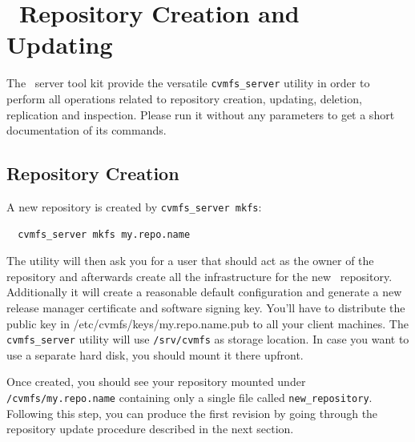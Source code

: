 
\section{\cvmfs\ Repository Creation and Updating}
\label{sct:repocreateandupdate}
The \cvmfs\ server tool kit provide the versatile \texttt{cvmfs\_server} utility in order to perform all operations related to repository creation, updating, deletion, replication and inspection.
Please run it without any parameters to get a short documentation of its commands.

\subsection{Repository Creation}
\label{sct:repocreation}

A new repository is created by \texttt{cvmfs\_server mkfs}:
\begin{verbatim}
  cvmfs_server mkfs my.repo.name
\end{verbatim}
The utility will then ask you for a user that should act as the owner of the repository and afterwards create all the infrastructure for the new \cvmfs\ repository.
Additionally it will create a reasonable default configuration and generate a new release manager certificate and software signing key. 
You'll have to distribute the public key in /etc/cvmfs/keys/my.repo.name.pub to all your client machines.
The \texttt{cvmfs\_server} utility will use \texttt{/srv/cvmfs} as storage location.
In case you want to use a separate hard disk, you should mount it there upfront.

Once created, you should see your repository mounted under \texttt{/cvmfs/my.repo.name} containing only a single file called \texttt{new\_repository}.
Following this step, you can produce the first revision by going through the repository update procedure described in the next section.

